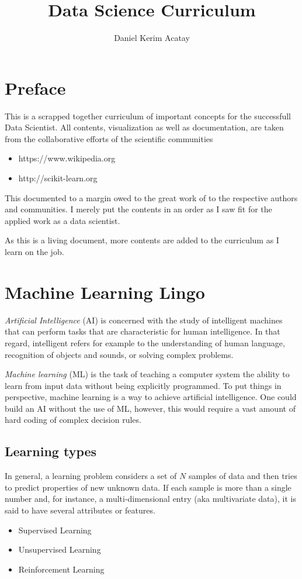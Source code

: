 \documentclass[11pt]{article}
\theoremstyle{plain}
\theoremstyle{definition}
\begin{document}
	
	
	\title{Data Science Curriculum}
	\author{Daniel Kerim Acatay}
	\maketitle
	
\section{Preface}
This is a scrapped together curriculum of important concepts for the successfull Data Scientist. All contents, visualization as well as documentation, are taken from the collaborative efforts of the scientific communities
\begin{itemize}
	\item https://www.wikipedia.org
	\item http://scikit-learn.org
\end{itemize}
This documented to a margin owed to the great work of to the respective authors and communities. I merely put the contents in an order as I saw fit for the applied work as a data scientist. 

As this is a living document, more contents are added to the curriculum as I learn on the job.

\section{Machine Learning Lingo}
\textit{Artificial Intelligence} (AI) is concerned with the study of intelligent machines that can perform tasks that are characteristic for human intelligence. In that regard, intelligent refers for example to the understanding of human language, recognition of objects and sounds, or solving complex problems. 

\textit{Machine learning} (ML) is the task of teaching a computer system the ability to learn from input data without being explicitly programmed. To put things in perspective, machine learning is a way to achieve artificial intelligence. One could build an AI without the use of ML, however, this would require a vast amount of hard coding of complex decision rules.

\subsection{Learning types}
In general, a learning problem considers a set of $N$ samples of data and then tries to predict properties of new unknown data. If each sample is more than a single number and, for instance, a multi-dimensional entry (aka multivariate data), it is said to have several attributes or features.
\begin{itemize}
	\item Supervised Learning
	\item Unsupervised Learning
	\item Reinforcement Learning
\end{itemize}
\end{document}
